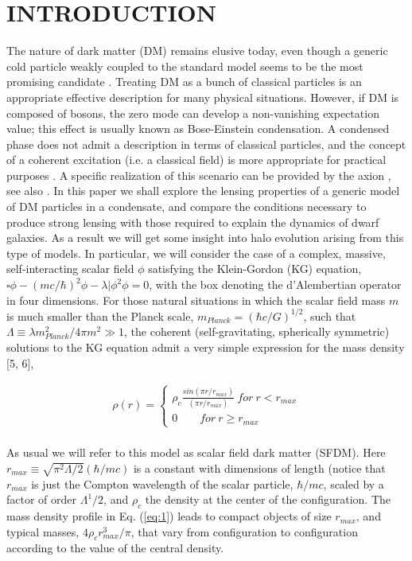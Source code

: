 \documentclass[10pt,letterpaper,twocolumn]{article}
\begin{document}
\section[I]{\centering \small {INTRODUCTION}}
The nature of dark matter (DM) remains elusive today,
even though a generic cold particle weakly coupled to the
standard model seems to be the most promising candidate
\cite{1}. Treating DM as a bunch of classical particles is
an appropriate effective description for many physical situations.
However, if DM is composed of bosons, the zero
mode can develop a non-vanishing expectation value; this
effect is usually known as Bose-Einstein condensation. A
condensed phase does not admit a description in terms
of classical particles, and the concept of a coherent excitation
(i.e. a classical field) is more appropriate for practical
purposes \cite{2}. A specific realization of this scenario
can be provided by the axion \cite{3}, see also \cite{4}.
In this paper we shall explore the lensing properties
of a generic model of DM particles in a condensate, and
compare the conditions necessary to produce strong lensing
with those required to explain the dynamics of dwarf
galaxies. As a result we will get some insight into halo
evolution arising from this type of models.
In particular, we will consider the case of a complex,
massive, self-interacting scalar field $\phi$ satisfying
the Klein-Gordon (KG) equation, $\square\phi - (mc/\hbar)^{2}\phi - \lambda|\phi^{2}\phi = 0$, with the box denoting the d'Alembertian
operator in four dimensions. For those natural situations
in which the scalar field mass $m$ is much smaller
than the Planck scale, $m_{Planck} = (\hbar c/G)^{1/2}$, such that
$\Lambda\equiv\lambda{m^2_{Planck}/4\pi{m^2}}\gg1$, the coherent (self-gravitating, spherically symmetric) solutions to the KG equation admit a very simple expression for the mass density [5, 6],

\begin{eqnarray}
\label{eq:1}
\rho(r)=\left\lbrace\begin{array}{rl}
\rho_{c}\frac{sin(\pi{r}/r_{max})}{(\pi{r}/r_{max})}~for~ r<r_{max}\\0~~~~~~~~~for~r\geq{r_{max}}\end{array}\right.
\end{eqnarray}
\\
As usual we will refer to this model as scalar field dark matter (SFDM). Here $r_{max}\equiv\sqrt{\pi^2\Lambda/2}(\hbar/mc)$ is a constant with dimensions of length (notice that $r_{max}$ is just the Compton wavelength of the scalar particle, $\hbar/mc$, scaled by a factor of order $\Lambda^1/2$, and $\rho_{c}$ the density at the center of the configuration. The mass density profile in Eq. (\ref{eq:1}) leads to compact objects of size $r_{max}$, and typical masses, $4\rho_{c}r^3_{max}/\pi$, that vary from configuration to configuration according to the value of the central density. 
\end{document}
